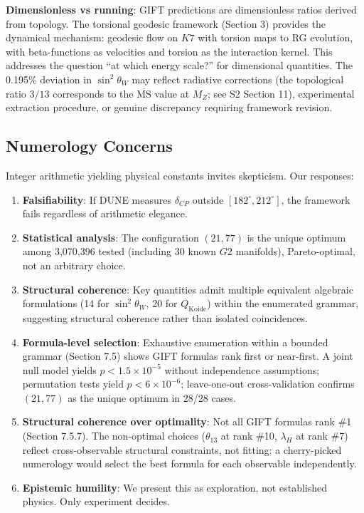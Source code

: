 \documentclass[11pt,a4paper]{article}
\newcommand{\Gtwo}{\mathrm{G}_2}
\newcommand{\Kseven}{K_7}
\newcommand{\CP}{\mathrm{CP}}
\def\CP{CP}%
\def\Gtwo{G2}%
\def\Kseven{K7}%
\begin{document}
\textbf{Dimensionless vs running}: GIFT predictions are dimensionless ratios derived from topology. The torsional geodesic framework (Section 3) provides the dynamical mechanism: geodesic flow on $\Kseven$ with torsion maps to RG evolution, with beta-functions as velocities and torsion as the interaction kernel. This addresses the question ``at which energy scale?'' for dimensional quantities. The 0.195\% deviation in $\sin^2\theta_W$ may reflect radiative corrections (the topological ratio $3/13$ corresponds to the $\overline{\mathrm{MS}}$ value at $M_Z$; see S2 Section 11), experimental extraction procedure, or genuine discrepancy requiring framework revision.

\subsection{Numerology Concerns}

Integer arithmetic yielding physical constants invites skepticism. Our responses:

\begin{enumerate}
\item \textbf{Falsifiability}: If DUNE measures $\delta_{\CP}$ outside $[182^\circ, 212^\circ]$, the framework fails regardless of arithmetic elegance.

\item \textbf{Statistical analysis}: The configuration $(21, 77)$ is the unique optimum among 3,070,396 tested (including 30 known $\Gtwo$ manifolds), Pareto-optimal, not an arbitrary choice.

\item \textbf{Structural coherence}: Key quantities admit multiple equivalent algebraic formulations (14 for $\sin^2\theta_W$, 20 for $Q_{\mathrm{Koide}}$) within the enumerated grammar, suggesting structural coherence rather than isolated coincidences.

\item \textbf{Formula-level selection}: Exhaustive enumeration within a bounded grammar (Section 7.5) shows GIFT formulas rank first or near-first. A joint null model yields $p < 1.5 \times 10^{-5}$ without independence assumptions; permutation tests yield $p < 6 \times 10^{-6}$; leave-one-out cross-validation confirms $(21, 77)$ as the unique optimum in 28/28 cases.

\item \textbf{Structural coherence over optimality}: Not all GIFT formulas rank \#1 (Section 7.5.7). The non-optimal choices ($\theta_{13}$ at rank \#10, $\lambda_H$ at rank \#7) reflect cross-observable structural constraints, not fitting: a cherry-picked numerology would select the best formula for each observable independently.

\item \textbf{Epistemic humility}: We present this as exploration, not established physics. Only experiment decides.
\end{enumerate}
\end{document}
